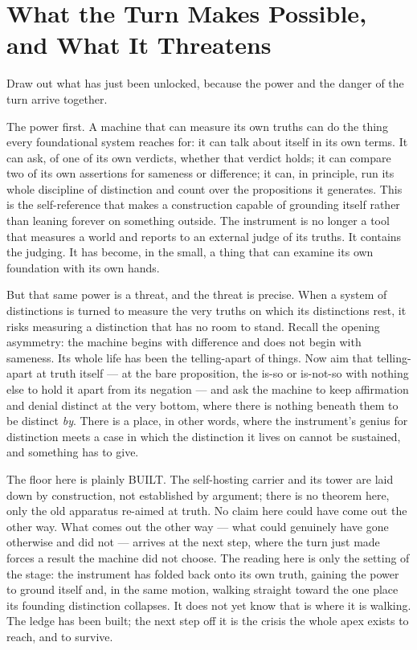 \section{What the Turn Makes Possible, and What It Threatens}

Draw out what has just been unlocked, because the power and the danger of the turn arrive together.

The power first. A machine that can measure its own truths can do the thing every foundational system reaches for:
it can talk about itself in its own terms. It can ask, of one of its own verdicts, whether that verdict holds; it
can compare two of its own assertions for sameness or difference; it can, in principle, run its whole discipline of
distinction and count over the propositions it generates. This is the self-reference that makes a construction
capable of grounding itself rather than leaning forever on something outside. The instrument is no longer a tool
that measures a world and reports to an external judge of its truths. It contains the judging. It has become, in
the small, a thing that can examine its own foundation with its own hands.

But that same power is a threat, and the threat is precise. When a system of distinctions is turned to measure the
very truths on which its distinctions rest, it risks measuring a distinction that has no room to stand. Recall the
opening asymmetry: the machine begins with difference and does not begin with sameness. Its whole life has
been the telling-apart of things. Now aim that telling-apart at truth itself --- at the bare proposition, the is-so
or is-not-so with nothing else to hold it apart from its negation --- and ask the machine to keep affirmation and
denial distinct at the very bottom, where there is nothing beneath them to be distinct \emph{by}. There is a place,
in other words, where the instrument's genius for distinction meets a case in which the distinction it lives on
cannot be sustained, and something has to give.

The floor here is plainly BUILT. The self-hosting carrier and its tower are laid down by construction, not
established by argument; there is no theorem here, only the old apparatus re-aimed at truth. No claim here could
have come out the other way. What comes out the other way --- what could genuinely have gone otherwise and did
not --- arrives at the next step, where the turn just made forces a result the machine did not choose. The
reading here is only the setting of the stage: the instrument has folded back onto its own truth, gaining the
power to ground itself and, in the same motion, walking straight toward the one place its founding distinction
collapses. It does not yet know that is where it is walking. The ledge has been built; the next step off it is
the crisis the whole apex exists to reach, and to survive.
